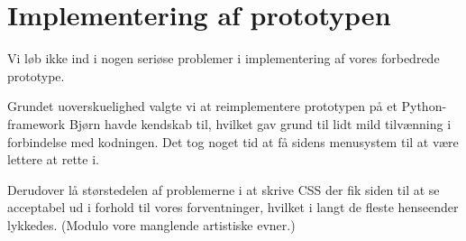 \section{Implementering af prototypen}

Vi løb ikke ind i nogen seriøse problemer i implementering af vores forbedrede prototype.

Grundet uoverskuelighed valgte vi at reimplementere prototypen på et Python-framework Bjørn havde kendskab til, hvilket gav grund til lidt mild tilvænning i forbindelse med kodningen. Det tog noget tid at få sidens menusystem til at være lettere at rette i.

Derudover lå størstedelen af problemerne i at skrive CSS der fik siden til at se acceptabel ud i forhold til vores forventninger, hvilket i langt de fleste henseender lykkedes. (Modulo vore manglende artistiske evner.)
